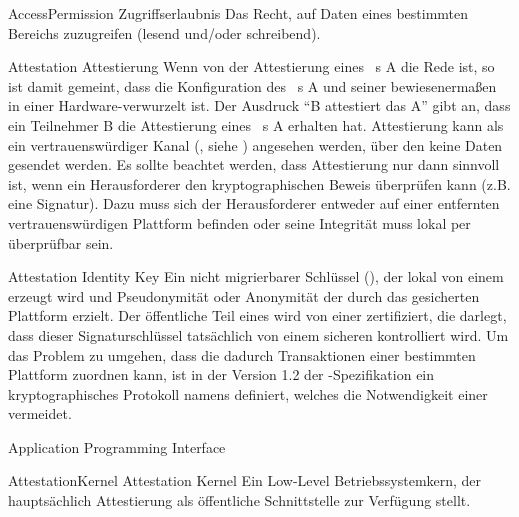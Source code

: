 \newcommand{\role}[1]{\ensuremath{\mathcal{#1\xspace}\xspace}\xspace}

\glosentry
          {AccessPermission}
          {Zugriffserlaubnis}
    {Das Recht, auf Daten eines bestimmten Bereichs zuzugreifen (lesend
     und/oder schreibend).}

\glosentry
          {Attestation}
          {Attestierung}
    {Wenn von der Attestierung eines \Compartment~s A die Rede ist, so ist
     damit gemeint, dass die Konfiguration des \Compartment~s A und seiner
     \TCB bewiesenerma\ss{}en in einer Hardware-\RTM verwurzelt ist.
     Der Ausdruck ``B attestiert das \Compartment A'' gibt an, dass ein
     Teilnehmer B die Attestierung eines \Compartment~s A erhalten hat.
     Attestierung kann als ein vertrauensw\"urdiger Kanal (\TrustedChannel,
     siehe \Channel) angesehen werden, \"uber den keine Daten gesendet
     werden. Es sollte beachtet werden, dass Attestierung nur dann sinnvoll
     ist, wenn ein Herausforderer den kryptographischen Beweis \"uberpr\"ufen
     kann (z.B. eine Signatur). Dazu muss sich der Herausforderer entweder
     auf einer entfernten vertrauensw\"urdigen Plattform befinden oder seine
     Integrit\"at muss lokal per \Sealing \"uberpr\"ufbar sein.}

          {Attestation Identity Key}
    {Ein nicht migrierbarer Schlüssel (\NMK), der lokal von einem \TPM erzeugt wird und Pseudonymit\"at oder Anonymit\"at der durch das \TPM gesicherten Plattform erzielt. Der
     \"offentliche Teil eines \AIK wird von einer \PrivacyCA zertifiziert,
     die darlegt, dass dieser Signaturschl\"ussel tats\"achlich von einem
     sicheren \TPM kontrolliert wird. Um das Problem zu umgehen, dass
     die \PrivacyCA dadurch Transaktionen einer bestimmten Plattform
     zuordnen kann, ist in der Version 1.2 der \TCG-Spezifikation ein
     kryptographisches Protokoll namens \DAA \cite{BrCaCh2004} definiert,
     welches die Notwendigkeit einer \PrivacyCA vermeidet.}

     {Application Programming Interface}

\glosentry
          {AttestationKernel}
          {Attestation Kernel}
    {Ein Low-Level Betriebssystemkern, der haupts\"achlich Attestierung
     als \"offentliche Schnittstelle zur Verf\"ugung stellt.}

